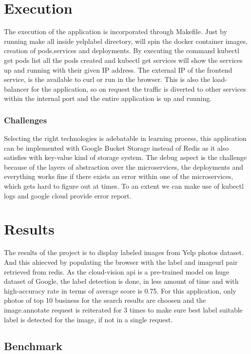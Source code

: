 \section{Execution}

The execution of the application is incorporated through
Makefile. Just by running make all inside yelplabel directory, will
spin the docker container images, creation of pods,services and
deployments. By executing the command kubectl get pods list all the
pods created and kubectl get services will show the services up and
running with their given IP address. The external IP of the frontend
service, is the available to curl or run in the browser. This is also
the load-balancer for the application, so on request the traffic is
diverted to other services within the internal port and the entire
application is up and running.
  
\subsubsection{Challenges} 

Selecting the right technologies is adebatable in learning process,
this application can be implemented with Google Bucket Storage instead
of Redis as it also satisfies with key-value kind of storage
system. The debug aspect is the challenge because of the layers of
abstraction over the microservices, the deployments and everything
works fine if there exists an error within one of the microservices,
which gets hard to figure out at times. To an extent we can make use
of kubectl logs and google cloud provide error report.
  
\section{Results}

The results of the project is to display labeled images from Yelp
photos dataset. And this ahiecved by populating the browser with the
label and imageurl pair retrieved from redis. As the cloud-vision api
is a pre-trained model on huge dataset of Google, the label detection
is done, in less amount of time and with high-accuracy rate in terms
of average score is 0.75. For this application, only photos of top 10
business for the search results are choosen and the image.annotate
request is reiterated for 3 times to make sure best label suitable
label is detected for the image, if not in a single request.

\subsection{Benchmark}

